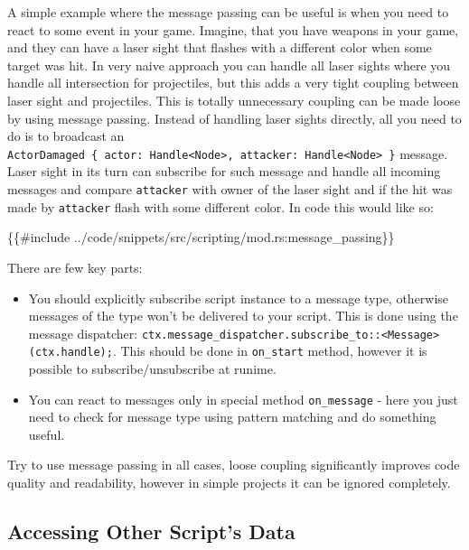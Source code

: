 \documentclass[
]{book}
\newenvironment{Shaded}{\begin{snugshade}}{\end{snugshade}}
\newcommand{\NormalTok}[1]{#1}
\providecommand{\tightlist}{%
  \setlength{\itemsep}{0pt}\setlength{\parskip}{0pt}}
\theoremstyle{definition}
\theoremstyle{definition}
\theoremstyle{definition}
\theoremstyle{definition}
\theoremstyle{remark}
\begin{document}
A simple example where the message passing can be useful is when you need to react to some event in your game. Imagine, that you have weapons in your game, and they can have a laser sight that flashes with a different color when some target was hit. In very naive approach you can handle all laser sights where you handle all intersection for projectiles, but this adds a very tight coupling between laser sight and projectiles. This is totally unnecessary coupling can be made loose by using message passing. Instead of handling laser sights directly, all you need to do is to broadcast an \texttt{ActorDamaged\ \{\ actor:\ Handle\textless{}Node\textgreater{},\ attacker:\ Handle\textless{}Node\textgreater{}\ \}} message. Laser sight in its turn can subscribe for such message and handle all incoming messages and compare \texttt{attacker} with owner of the laser sight and if the hit was made by \texttt{attacker} flash with some different color. In code this would like so:

\begin{Shaded}
\begin{Highlighting}[]
\NormalTok{\{\{\#include ../code/snippets/src/scripting/mod.rs:message\_passing\}\}}
\end{Highlighting}
\end{Shaded}

There are few key parts:

\begin{itemize}
\tightlist
\item
  You should explicitly subscribe script instance to a message type, otherwise messages of the type won't be delivered to your script. This is done using the message dispatcher: \texttt{ctx.message\_dispatcher.subscribe\_to::\textless{}Message\textgreater{}(ctx.handle);}. This should be done in \texttt{on\_start} method, however it is possible to subscribe/unsubscribe at runime.
\item
  You can react to messages only in special method \texttt{on\_message} - here you just need to check for message type using pattern matching and do something useful.
\end{itemize}

Try to use message passing in all cases, loose coupling significantly improves code quality and readability, however in simple projects it can be ignored completely.

\subsection{Accessing Other Script's Data}\label{accessing-other-scripts-data}
\end{document}
